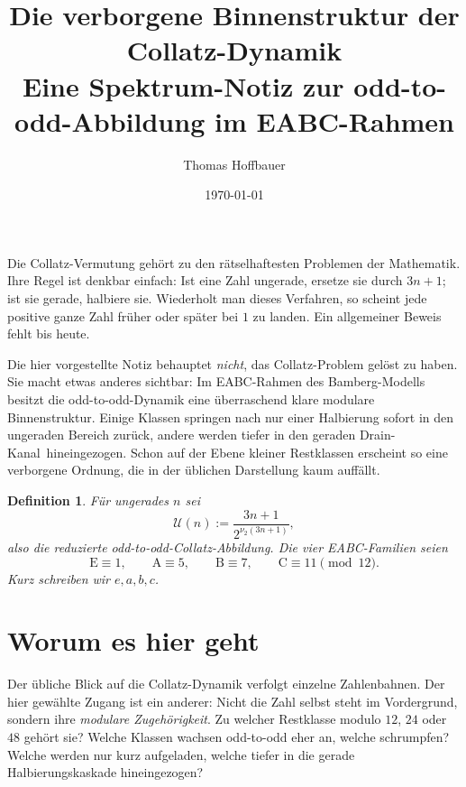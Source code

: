 \documentclass[12pt,a4paper]{article}
\title{Die verborgene Binnenstruktur der Collatz-Dynamik\\
\large Eine Spektrum-Notiz zur odd-to-odd-Abbildung im EABC-Rahmen}
\author{Thomas Hoffbauer}
\date{\today}
\newtheorem{definition}{Definition}
\newcommand{\vii}{\nu_2}
\newcommand{\U}{\mathcal U}
\newcommand{\E}{\mathrm{E}}
\newcommand{\A}{\mathrm{A}}
\newcommand{\B}{\mathrm{B}}
\newcommand{\Cc}{\mathrm{C}}
\begin{document}
\maketitle

\begin{center}
\begin{minipage}{0.95\textwidth}
\small
Die Collatz-Vermutung gehört zu den rätselhaftesten Problemen der Mathematik. Ihre Regel ist denkbar einfach: Ist eine Zahl ungerade, ersetze sie durch \(3n+1\); ist sie gerade, halbiere sie. Wiederholt man dieses Verfahren, so scheint jede positive ganze Zahl früher oder später bei \(1\) zu landen. Ein allgemeiner Beweis fehlt bis heute.

Die hier vorgestellte Notiz behauptet \emph{nicht}, das Collatz-Problem gelöst zu haben. Sie macht etwas anderes sichtbar: Im EABC-Rahmen des Bamberg-Modells besitzt die odd-to-odd-Dynamik eine überraschend klare modulare Binnenstruktur. Einige Klassen springen nach nur einer Halbierung sofort in den ungeraden Bereich zurück, andere werden tiefer in den geraden \glqq Drain-Kanal\grqq\ hineingezogen. Schon auf der Ebene kleiner Restklassen erscheint so eine verborgene Ordnung, die in der üblichen Darstellung kaum auffällt.
\end{minipage}
\end{center}

\vspace{0.6em}

\begin{definition}
Für ungerades \(n\) sei
\[
\U(n):=\frac{3n+1}{2^{\vii(3n+1)}},
\]
also die reduzierte odd-to-odd-Collatz-Abbildung.
Die vier EABC-Familien seien
\[
\E\equiv 1,\qquad
\A\equiv 5,\qquad
\B\equiv 7,\qquad
\Cc\equiv 11 \pmod{12}.
\]
Kurz schreiben wir \(e,a,b,c\).
\end{definition}

\section*{Worum es hier geht}

Der übliche Blick auf die Collatz-Dynamik verfolgt einzelne Zahlenbahnen. Der hier gewählte Zugang ist ein anderer: Nicht die Zahl selbst steht im Vordergrund, sondern ihre \emph{modulare Zugehörigkeit}. Zu welcher Restklasse modulo \(12\), \(24\) oder \(48\) gehört sie? Welche Klassen wachsen odd-to-odd eher an, welche schrumpfen? Welche werden nur kurz \glqq aufgeladen\grqq, welche tiefer in die gerade Halbierungskaskade hineingezogen?
\end{document}
